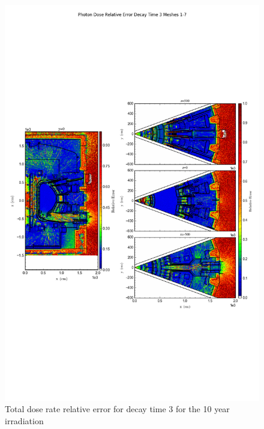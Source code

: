 \documentclass[12pt]{article}
\begin{document}
\begin{figure}[ht!]
\centering
\includegraphics[trim={0cm 8cm, 0cm 8cm},clip,scale=0.75]{../plots/final_model_with_b4c/10year/Photon_Dose_Relative_Error_Decay_Time_3_Meshes_1-7.png}
\caption{Total dose rate relative error for decay time 3 for the 10 year irradiation}
\label{fig:photons_10y_dc3_nob4c_relerr}
\end{figure}
\newpage
\end{document}
